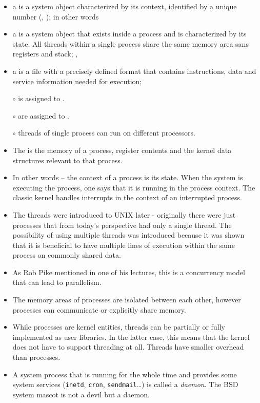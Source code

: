 
\begin{slide}
\begin{itemize}
\item a  is a system object characterized by its context,
identified by a unique number (,
); in other words 
\item a  is a system object that exists inside a process and
is characterized by its state. All threads within a single process share
the same memory area sans registers and stack; ,
\item a  is a file with a precisely defined format that contains
instructions, data and service information needed for execution;
\end{itemize}

\begin{itemize}
\item[$\circ$]  is assigned to .
\item[$\circ$]  are assigned to .
\item[$\circ$] threads of single process can run on different processors.
\end{itemize}
\end{slide}

\begin{itemize}
\item The  is the memory of a process, register contents and
the kernel data structures relevant to that process.
\item In other words -- the context of a process is its state. When the system
is executing the process, one says that it is running in the process context.
The classic kernel handles interrupts in the context of an interrupted process.
\item The threads were introduced to UNIX later - originally there were just
processes that from today's perspective had only a single thread. The
possibility of using multiple threads was introduced because it was shown that
it is beneficial to have multiple lines of execution within the same process on
commonly shared data.
\item As Rob Pike mentioned in one of his lectures, this is a concurrency model
that can lead to parallelism.
\item The memory areas of processes are isolated between each other, however
processes can communicate or explicitly share memory.
\item While processes are kernel entities, threads can be partially or fully
implemented as user libraries. In the latter case, this means that the kernel
does not have to support threading at all. Threads have smaller overhead than
processes.
\item A system process that is running for the whole time and provides some
system services (\texttt{inetd}, \texttt{cron}, \texttt{sendmail}\dots) is
called a \emph{daemon}. The BSD system mascot is not a devil but a daemon.
\end{itemize}

